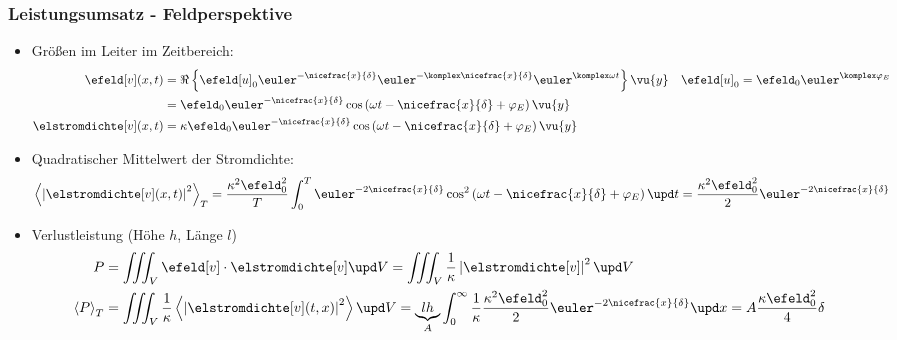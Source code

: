 \begin{frame}
   \frametitle{Leistungsumsatz - Feldperspektive}
\begin{itemize}[<+->]
\item Größen im Leiter im Zeitbereich:
  \begin{align*}
    \efeld[v](x,t) &= \Re \left\{ \efeld[u]_{0} \euler^{-\nicefrac{x}{\delta}} \euler^{-\komplex\nicefrac{x}{\delta}} \euler^{\komplex\omega t} \right\} \vu{y}   \quad \efeld[u]_{0} = \efeld_{0} \euler^{\komplex\varphi_E} \\
    &= \efeld_0 \euler^{-\nicefrac{x}{\delta}} \cos\left(\omega t -\nicefrac{x}{\delta} +\varphi_E \right) \vu{y} \\
   \elstromdichte[v](x,t) &= \kappa\efeld_0 \euler^{-\nicefrac{x}{\delta}} \cos\left(\omega t -\nicefrac{x}{\delta} +\varphi_E \right) \vu{y} 
  \end{align*}
\item Quadratischer Mittelwert der Stromdichte:
  $$\left\langle \left| \elstromdichte[v](x,t) \right|^2  \right\rangle_T  = \frac{\kappa^2\efeld_0^2}{T} \int_0^T \euler^{-2\nicefrac{x}{\delta}} \cos^2\left(\omega t -\nicefrac{x}{\delta} +\varphi_E \right) \upd t = \frac{\kappa^2\efeld_0^2}{2} \euler^{-2\nicefrac{x}{\delta}}
  $$
\item Verlustleistung (Höhe $h$, Länge $l$)
  \begin{align*}
    P &= \iiint_V \efeld[v]\cdot\elstromdichte[v]\upd V = \iiint_V \frac{1}{\kappa}\left|\elstromdichte[v]\right|^2\upd V\\
    \left\langle P\right\rangle_T &=\iiint_V \frac{1}{\kappa}\left\langle\left|\elstromdichte[v](t,x)\right|^2\right\rangle\upd V = \underbrace{l h}_{A}\int_0^\infty \frac{1}{\kappa}\frac{\kappa^2\efeld_0^2}{2} \euler^{-2\nicefrac{x}{\delta}}\upd x = A  \frac{\kappa\efeld_0^2}{4} \delta
    \end{align*}
 \end{itemize}
\end{frame}

